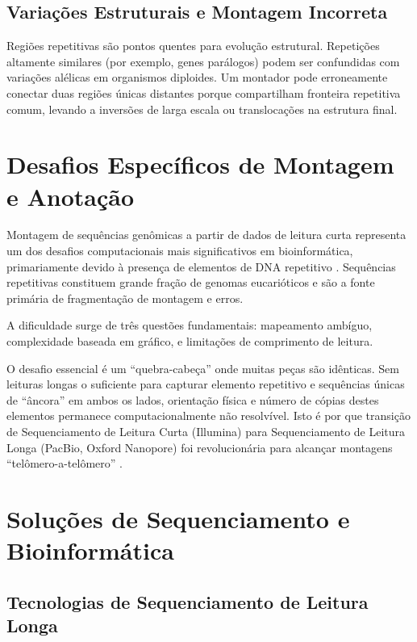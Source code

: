 \subsection{Variações Estruturais e Montagem Incorreta}

Regiões repetitivas são pontos quentes para evolução estrutural. Repetições altamente similares (por exemplo, genes parálogos) podem ser confundidas com variações alélicas em organismos diploides. Um montador pode erroneamente conectar duas regiões únicas distantes porque compartilham fronteira repetitiva comum, levando a inversões de larga escala ou translocações na estrutura final.

\section{Desafios Específicos de Montagem e Anotação}

Montagem de sequências genômicas a partir de dados de leitura curta representa um dos desafios computacionais mais significativos em bioinformática, primariamente devido à presença de elementos de DNA repetitivo \parencite{treangen2011,phillippy2008,chaisson2015}. Sequências repetitivas constituem grande fração de genomas eucarióticos e são a fonte primária de fragmentação de montagem e erros.

A dificuldade surge de três questões fundamentais: mapeamento ambíguo, complexidade baseada em gráfico, e limitações de comprimento de leitura.

O desafio essencial é um ``quebra-cabeça'' onde muitas peças são idênticas. Sem leituras longas o suficiente para capturar elemento repetitivo e sequências únicas de ``âncora'' em ambos os lados, orientação física e número de cópias destes elementos permanece computacionalmente não resolvível. Isto é por que transição de Sequenciamento de Leitura Curta (Illumina) para Sequenciamento de Leitura Longa (PacBio, Oxford Nanopore) foi revolucionária para alcançar montagens ``telômero-a-telômero'' \parencite{logsdon2020}.

\section{Soluções de Sequenciamento e Bioinformática}

\subsection{Tecnologias de Sequenciamento de Leitura Longa}

